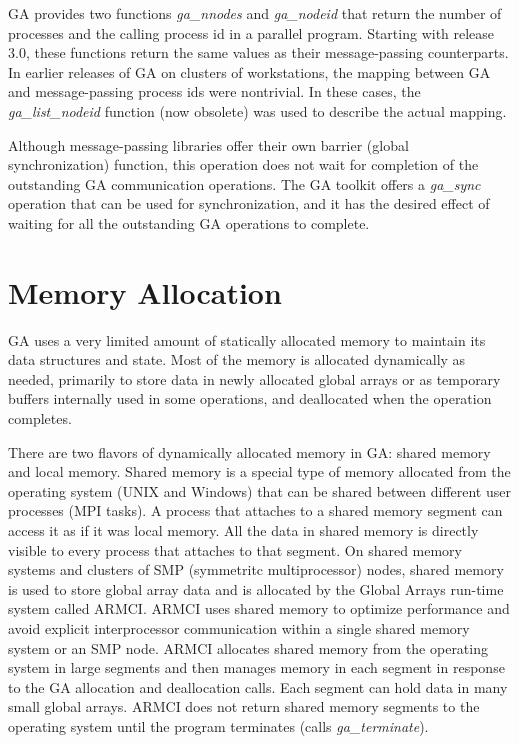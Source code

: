 GA provides two functions \emph{ga\_nnodes} and \emph{ga\_nodeid} that return
the number of processes and the calling process id in a parallel program.
Starting with release 3.0, these functions return the same values as their
message-passing counterparts. In earlier releases of GA on clusters of
workstations, the mapping between GA and message-passing process ids were
nontrivial. In these cases, the \emph{ga\_list\_nodeid} function (now obsolete)
was used to describe the actual mapping.

Although message-passing libraries offer their own barrier (global
synchronization) function, this operation does not wait for completion of the
outstanding GA communication operations. The GA toolkit offers a
\emph{ga\_sync} operation that can be used for synchronization, and it has the
desired effect of waiting for all the outstanding GA operations to complete. 

\section{Memory Allocation}
\label{sub:Memory-Allocation}

GA uses a very limited amount of statically allocated memory to maintain its
data structures and state. Most of the memory is allocated dynamically as
needed, primarily to store data in newly allocated global arrays or as
temporary buffers internally used in some operations, and deallocated when the
operation completes.

There are two flavors of dynamically allocated memory in GA: shared memory and
local memory. Shared memory is a special type of memory allocated from the
operating system (UNIX and Windows) that can be shared between different user
processes (MPI tasks). A process that attaches to a shared memory segment can
access it as if it was local memory. All the data in shared memory is directly
visible to every process that attaches to that segment. On shared memory
systems and clusters of SMP (symmetritc multiprocessor) nodes, shared memory is
used to store global array data and is allocated by the Global Arrays run-time
system called ARMCI. ARMCI uses shared memory to optimize performance and avoid
explicit interprocessor communication within a single shared memory system or
an SMP node. ARMCI allocates shared memory from the operating system in large
segments and then manages memory in each segment in response to the GA
allocation and deallocation calls. Each segment can hold data in many small
global arrays. ARMCI does not return shared memory segments to the operating
system until the program terminates (calls \emph{ga\_terminate}).

